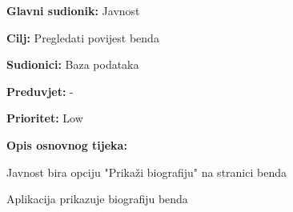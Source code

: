 \noindent {}
	\begin{packed_item}
		
		\item \textbf{Glavni sudionik:} Javnost
		\item \textbf{Cilj:} Pregledati povijest benda
		\item \textbf{Sudionici:} Baza podataka
		\item \textbf{Preduvjet:} -
		\item \textbf{Prioritet:} Low
		\item \textbf{Opis osnovnog tijeka:} 
		
		\item[] \begin{packed_enum}
			
			\item Javnost bira opciju "Prikaži biografiju" na stranici benda
			\item Aplikacija prikazuje biografiju benda
		\end{packed_enum}  
	\end{packed_item}

